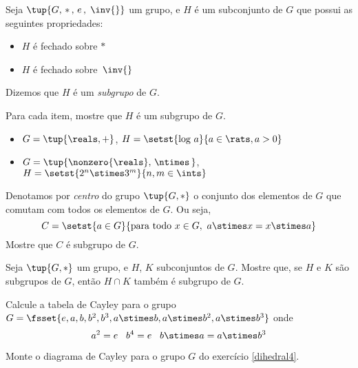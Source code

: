\begin{definition}
	Seja $\tup{G, \, * \,, \, e \,, \;\inv{}}$ um grupo, e $H$ é um subconjunto de $G$ que possui as seguintes propriedades:
	\begin{itemize}
		\item $H$ é fechado sobre $*$
		\item $H$ é fechado sobre $\,\inv{}$
	\end{itemize}
	Dizemos que $H$ é um \emph{subgrupo} de $G$.
\end{definition}

\begin{exercise}
	Para cada item, mostre que $H$ é um subgrupo de $G$.
	\begin{itemize}
		\item $G = \tup{\reals, +}$, $H = \setst{\textrm{log}\ a}{a \in \rats, a > 0}$
		\item $G = \tup{\nonzero{\reals}, \, \ntimes \, }$, $H = \setst{2^n \stimes 3^m}{n, m \in \ints}$ 
	\end{itemize}
\end{exercise}

\begin{exercise}
	Denotamos por \emph{centro} do grupo $\tup{G, *}$ o conjunto dos elementos de $G$ que comutam com todos os elementos de $G$. Ou seja,
		\[ C = \setst{a \in G}{\textrm{para todo}\ x \in G,\ a \stimes x = x \stimes a} \]
	Mostre que $C$ é subgrupo de $G$.
\end{exercise}

\begin{exercise}
	Seja $\tup{G, *}$ um grupo, e $H$, $K$ subconjuntos de $G$. Mostre que, se $H$ e $K$ são subgrupos de $G$, então $H \cap K$ também é subgrupo de $G$.
\end{exercise}

\begin{exercise}
	\label{dihedral4}
	Calcule a tabela de Cayley para o grupo $G = \fsset{e, a, b, b^2, b^3, a \stimes b, a \stimes b^2, a \stimes b^3}$ onde
		\[ a^2 = e \;\;\; b^4 = e \;\;\; b \stimes a = a \stimes b^3 \]
\end{exercise}

\begin{exercise}
	Monte o diagrama de Cayley para o grupo $G$ do exercício \ref{dihedral4}.
\end{exercise}